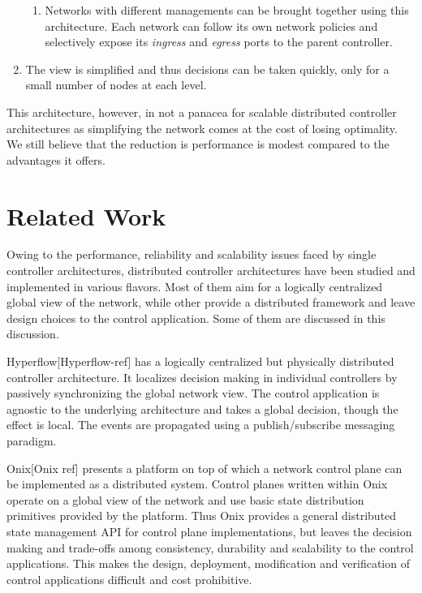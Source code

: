 \documentclass[10pt, twocolumn]{article}
\begin{document}
\begin{enumerate}
\begin{enumerate}
            \item Networks with different managements can be brought together using this architecture. Each network can follow its own network policies and selectively expose its \emph{ingress} and \emph{egress} ports to the parent controller.
        \end{enumerate}
    \item The view is simplified and thus decisions can be taken quickly, only for a small number of nodes at each level.
\end{enumerate}

This architecture, however, in not a panacea for scalable distributed controller architectures as simplifying the network comes at the cost of losing optimality. We still believe that the reduction is performance is modest compared to the advantages it offers.

\section{Related Work}
\label{sec:related}
Owing to the performance, reliability and scalability issues faced by single controller architectures, distributed controller architectures have been studied and implemented in various flavors. Most of them aim for a logically centralized global view of the network, while other provide a distributed framework and leave design choices to the control application. Some of them are discussed in this discussion.

Hyperflow[Hyperflow-ref] has a logically centralized but physically distributed controller architecture. It localizes decision making in individual controllers by passively synchronizing the global network view. The control application is agnostic to the underlying architecture and takes a global decision, though the effect is local. The events are propagated using a publish/subscribe messaging paradigm.

Onix[Onix ref] presents a platform on top of which a network control plane can be implemented as a distributed system. Control planes written within Onix operate on a global view of the network and use basic state distribution primitives provided by the platform. Thus Onix provides a general distributed state management API for control plane implementations, but leaves the decision making and trade-offs among consistency, durability and scalability to the control applications. This makes the design, deployment, modification and verification of control applications difficult and cost prohibitive.
\end{document}
